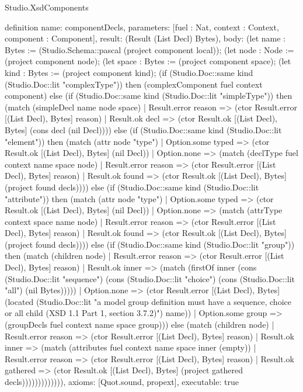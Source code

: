 \begin{lexlean}{Studio.XsdComponents}
\begin{semanticmodule}
definition{
  name: componentDecls,
  parameters: [fuel : Nat, context : Context, component : Component],
  result: (Result (List Decl) Bytes),
  body: (let name : Bytes := (Studio.Schema::pascal (project component local)); (let node : Node := (project component node); (let space : Bytes := (project component space); (let kind : Bytes := (project component kind); (if (Studio.Doc::same kind (Studio.Doc::lit "complexType")) then (complexComponent fuel context component) else (if (Studio.Doc::same kind (Studio.Doc::lit "simpleType")) then (match (simpleDecl name node space)
    | Result.error reason => (ctor Result.error [(List Decl), Bytes] reason)
    | Result.ok decl => (ctor Result.ok [(List Decl), Bytes] (cons decl (nil Decl)))) else (if (Studio.Doc::same kind (Studio.Doc::lit "element")) then (match (attr node "type")
    | Option.some typed => (ctor Result.ok [(List Decl), Bytes] (nil Decl))
    | Option.none => (match (declType fuel context name space node)
      | Result.error reason => (ctor Result.error [(List Decl), Bytes] reason)
      | Result.ok found => (ctor Result.ok [(List Decl), Bytes] (project found decls)))) else (if (Studio.Doc::same kind (Studio.Doc::lit "attribute")) then (match (attr node "type")
    | Option.some typed => (ctor Result.ok [(List Decl), Bytes] (nil Decl))
    | Option.none => (match (attrType context space name node)
      | Result.error reason => (ctor Result.error [(List Decl), Bytes] reason)
      | Result.ok found => (ctor Result.ok [(List Decl), Bytes] (project found decls)))) else (if (Studio.Doc::same kind (Studio.Doc::lit "group")) then (match (children node)
    | Result.error reason => (ctor Result.error [(List Decl), Bytes] reason)
    | Result.ok inner => (match (firstOf inner (cons (Studio.Doc::lit "sequence") (cons (Studio.Doc::lit "choice") (cons (Studio.Doc::lit "all") (nil Bytes)))))
      | Option.none => (ctor Result.error [(List Decl), Bytes] (located (Studio.Doc::lit "a model group definition must have a sequence, choice or all child (XSD 1.1 Part 1, section 3.7.2)") name))
      | Option.some group => (groupDecls fuel context name space group))) else (match (children node)
    | Result.error reason => (ctor Result.error [(List Decl), Bytes] reason)
    | Result.ok inner => (match (attributes fuel context name space inner (empty))
      | Result.error reason => (ctor Result.error [(List Decl), Bytes] reason)
      | Result.ok gathered => (ctor Result.ok [(List Decl), Bytes] (project gathered decls))))))))))))),
  axioms: [Quot.sound, propext],
  executable: true
}


\end{semanticmodule}
\end{lexlean}
